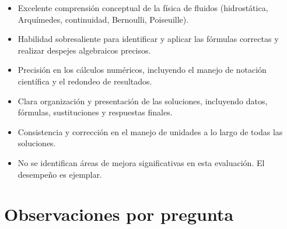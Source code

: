 \documentclass[11pt,a4paper]{article}
\begin{document}
\vspace{4pt}
\begin{minipage}[t]{0.48\linewidth}
  \begin{tcolorbox}[cajaFortaleza, title={Fortalezas}]
\begin{itemize}[leftmargin=1.5em, itemsep=2pt]
  \item Excelente comprensión conceptual de la física de fluidos (hidrostática, Arquímedes, continuidad, Bernoulli, Poiseuille).
  \item Habilidad sobresaliente para identificar y aplicar las fórmulas correctas y realizar despejes algebraicos precisos.
  \item Precisión en los cálculos numéricos, incluyendo el manejo de notación científica y el redondeo de resultados.
  \item Clara organización y presentación de las soluciones, incluyendo datos, fórmulas, sustituciones y respuestas finales.
  \item Consistencia y corrección en el manejo de unidades a lo largo de todas las soluciones.
\end{itemize}
  \end{tcolorbox}
\end{minipage}
\hfill
\begin{minipage}[t]{0.48\linewidth}
  \begin{tcolorbox}[cajaMejora, title={Areas de mejora}]
\begin{itemize}[leftmargin=1.5em, itemsep=2pt]
  \item No se identifican áreas de mejora significativas en esta evaluación. El desempeño es ejemplar.
\end{itemize}
  \end{tcolorbox}
\end{minipage}

\section*{Observaciones por pregunta}
\end{document}
